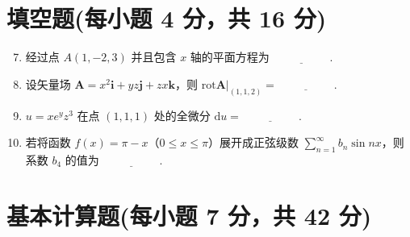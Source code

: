 \documentclass[../Main.tex]{subfiles}
\begin{document}
\section{填空题(每小题 4 分，共 16 分)}
\begin{enumerate}
    \setcounter{enumi}{6}
    \item 经过点 \( A(1,-2,3) \) 并且包含 \( x \) 轴的平面方程为 \(\underline{\hspace{5em}}\).
          \vspace{1em}

    \item 设矢量场 \( \boldsymbol{A} = x^2 \boldsymbol{i} + y z \boldsymbol{j} + z x \boldsymbol{k} \)，则 \(  \text{rot}\boldsymbol{A} \Big|_{(1,1,2)} = \underline{\hspace{5em}}\).
          \vspace{1em}

    \item \( u = x e^{y}z^3 \) 在点 \( (1,1,1) \) 处的全微分 \( \mathrm{d}u = \underline{\hspace{5em}}\).
          \vspace{1em}

    \item 若将函数 \( f(x) = \pi - x \)（\( 0 \leq x \leq \pi \)）展开成正弦级数 \( \sum \limits_{n=1}^{\infty} b_n \sin nx \)，则系数 \( b_4 \) 的值为 \(\underline{\hspace{5em}}\).
          \vspace{1em}
\end{enumerate}

\section{基本计算题(每小题 7 分，共 42 分)}
\end{document}
